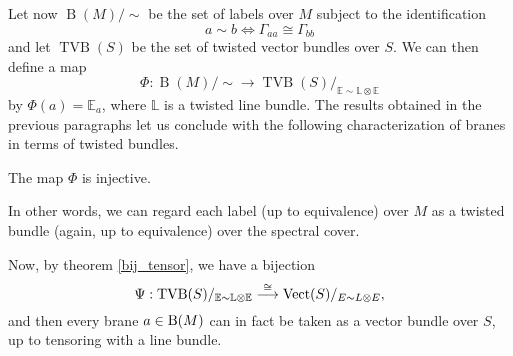 Let now $\operatorname{B}(M)/\sim$ be the set of labels over $M$ subject to the identification
$$a\sim b \Longleftrightarrow \Gamma_{aa}\cong \Gamma_{bb}$$
and let $\operatorname{TVB}(S)$ be the set of twisted vector bundles over $S$. We can then define a map
$$\Phi :\operatorname{B}(M)/\sim \longrightarrow \operatorname{TVB}(S)/_{\mathbb{E}\sim \mathbb{L}\otimes \mathbb{E}}$$
by
$\Phi (a)=\mathbb{E}_a$, where $\mathbb{L}$ is a twisted line bundle. The results obtained in the previous paragraphs let us conclude with the following characterization of branes in terms of twisted bundles.

\begin{theorem}
The map $\Phi$ is injective.
\end{theorem}

In other words, we can regard each label (up to equivalence) over $M$ as a twisted bundle (again, up to equivalence) over the spectral cover.

Now, by theorem \ref{bij_tensor}, we have a bijection
$$\Psi :\operatorname{TVB}(S)/_{\mathbb{E}\sim \mathbb{L}\otimes \mathbb{E}}\stackrel{\cong}{\longrightarrow}\operatorname{Vect}(S)/_{E\sim L\otimes E},$$
and then every brane $a\in \operatorname{B}(M)$ can in fact be taken as a vector bundle over $S$, up to tensoring with a line bundle.




\clearpage

